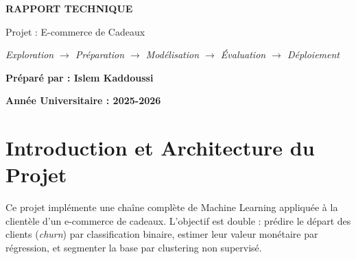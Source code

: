 \documentclass[11pt,a4paper]{article}
\begin{document}
\begin{titlepage}
\vspace{6cm}
\begin{center}
{\LARGE\textbf{RAPPORT TECHNIQUE}}\par
\vspace{1cm}
{\large Projet : E-commerce de Cadeaux}\par
\vspace{0.5cm}
{\large \textit{Exploration $\rightarrow$ Préparation $\rightarrow$ Modélisation $\rightarrow$ Évaluation $\rightarrow$ Déploiement}}\par
\vspace{2cm}
{\large \textbf{Préparé par : Islem Kaddoussi}}\par
\vspace{3cm}
\vspace{3cm}
{\textbf{Année Universitaire : 2025-2026}}
\end{center}
\end{titlepage}

\tableofcontents
\newpage

\section{Introduction et Architecture du Projet}

Ce projet implémente une chaîne complète de Machine Learning appliquée à la clientèle d'un e-commerce de cadeaux. L'objectif est double : prédire le départ des clients (\textit{churn}) par classification binaire, estimer leur valeur monétaire par régression, et segmenter la base par clustering non supervisé.
\end{document}
